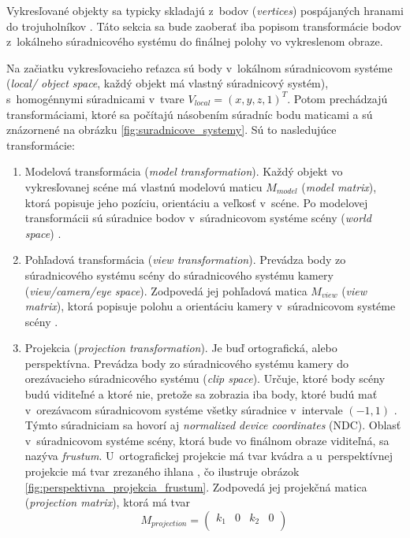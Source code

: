 Vykresľované objekty sa typicky skladajú z~bodov (\emph{vertices}) pospájaných hranami do trojuholníkov \cite{stemkoski_graphics}. Táto sekcia sa bude zaoberať iba popisom transformácie bodov z~lokálneho súradnicového systému do finálnej polohy vo vykreslenom obraze.

Na začiatku vykresľovacieho reťazca sú body v~lokálnom súradnicovom systéme (\emph{\mbox{local}/ object space}, každý objekt má vlastný súradnicový systém), s~homogénnymi súradnicami v~tvare $V_{local} = (x, y, z, 1)^T$. Potom prechádzajú transformáciami, ktoré sa počítajú násobením súradníc bodu maticami a sú znázornené na obrázku \ref{fig:suradnicove_systemy}. Sú to nasledujúce transformácie:

\begin{enumerate}
    \item Modelová transformácia (\emph{model transformation}). Každý objekt vo vykresľovanej scéne má vlastnú modelovú maticu $M_{model}$ (\emph{model matrix}), ktorá popisuje jeho pozíciu, orientáciu a veľkosť v~scéne. Po modelovej transformácii sú súradnice bodov v~súradnicovom systéme scény (\emph{world space}) \cite{de_vries_coordinate_systems, stemkoski_graphics}.
    \item Pohľadová transformácia (\emph{view transformation}). Prevádza body zo súradnicového systému scény do súradnicového systému kamery (\emph{view/camera/eye space}). Zodpovedá jej pohľadová matica $M_{view}$ (\emph{view matrix}), ktorá popisuje polohu a orientáciu kamery v~súradnicovom systéme scény \cite{de_vries_coordinate_systems, stemkoski_graphics}. 
    \item Projekcia (\emph{projection transformation}). Je buď ortografická, alebo perspektívna. Prevádza body zo súradnicového systému kamery do orezávacieho súradnicového systému (\emph{clip space}). Určuje, ktoré body scény budú viditeľné a ktoré nie, pretože sa zobrazia iba body, ktoré budú mať v~orezávacom súradnicovom systéme všetky súradnice v~intervale $(-1, 1)$ \cite{stemkoski_graphics}. Týmto súradniciam sa hovorí aj \emph{normalized device coordinates} (NDC). Oblasť v~súradnicovom systéme scény, ktorá bude vo finálnom obraze viditeľná, sa nazýva \emph{frustum}. U~ortografickej projekcie má tvar kvádra a u~perspektívnej projekcie má tvar zrezaného ihlana \cite{de_vries_coordinate_systems}, čo ilustruje obrázok \ref{fig:perspektivna_projekcia_frustum}. Zodpovedá jej projekčná matica (\emph{projection matrix}), ktorá má tvar 
    $$
    M_{projection} = 
    \begin{pmatrix}
    k_1 & 0 & k_2 & 0 \\

\end{pmatrix}$$
\end{enumerate}
